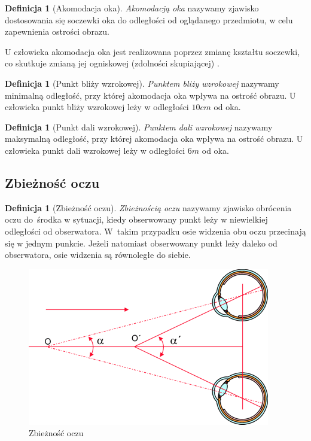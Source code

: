 \documentclass[a4paper,11pt,twoside]{report}
\theoremstyle{definition}
\newtheorem{definition}[theorem]{Definicja}
\begin{document}
\begin{definition}[Akomodacja oka]
\textit{Akomodacją oka} nazywamy zjawisko dostosowania się soczewki oka do odległości od oglądanego przedmiotu, w celu zapewnienia ostrości obrazu.
\end{definition}

U człowieka akomodacja oka jest realizowana poprzez zmianę kształtu soczewki, co skutkuje zmianą jej ogniskowej (zdolności skupiającej) \cite{eyeAccomodation}.

\begin{definition}[Punkt bliży wzrokowej]
\textit{Punktem bliży wzrokowej} nazywamy minimalną odległość, przy której akomodacja oka wpływa na ostrość obrazu. U człowieka punkt bliży wzrokowej leży w odległości $10 cm$ od oka.
\end{definition}

\begin{definition}[Punkt dali wzrokowej]
\textit{Punktem dali wzrokowej} nazywamy maksymalną odległość, przy której akomodacja oka wpływa na ostrość obrazu. U człowieka punkt dali wzrokowej leży w odległości $6 m$ od oka.
\end{definition}

\subsection{Zbieżność oczu}

\begin{definition}[Zbieżność oczu]
\textit{Zbieżnością oczu} nazywamy zjawisko obrócenia oczu do~środka w sytuacji, kiedy obserwowany punkt leży w niewielkiej odległości od obserwatora. W~takim przypadku osie widzenia obu oczu przecinają się w jednym punkcie. Jeżeli natomiast obserwowany punkt leży daleko od obserwatora, osie widzenia są równoległe do siebie.\cite{eyeConvergence}
\end{definition}

\begin{figure}[h]
\centering
\includegraphics[scale=1]{images/zbieznosc}
\caption[Zbieżność oczu\cite{zbieznosc}]{Zbieżność oczu}
\end{figure}
\end{document}
